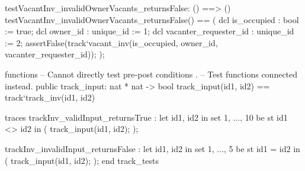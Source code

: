 \documentclass[a4paper]{article}
\begin{document}
\begin{vdm_al}
    testVacantInv_invalidOwnerVacants_returnsFalse: () ==> ()
    testVacantInv_invalidOwnerVacants_returnsFalse() == 
    (
        dcl is_occupied : bool := true; 
        dcl owner_id : unique_id := 1;
        dcl vacanter_requester_id : unique_id := 2; 
        assertFalse(track`vacant_inv(is_occupied, owner_id, vacanter_requester_id));
    );

functions 
    -- Cannot directly test pre-post conditions .
    -- Test functions connected instead. 
    public track_input: nat * nat -> bool 
    track_input(id1, id2) == track`track_inv(id1, id2)

traces 
    trackInv_validInput_returnsTrue : 
        let id1, id2 in set {1, ..., 10} be st id1 <> id2 
            in
            (
                track_input(id1, id2); 
            );

    trackInv_invalidInput_returnsFalse : 
    let id1, id2 in set {1, ..., 5} be st id1 = id2 
        in
        (
            track_input(id1, id2); 
        );
end track_tests 
\end{vdm_al}
\end{document}
